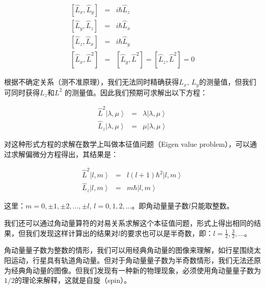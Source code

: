 \begin{eqnarray}
\left[ {\hat L_x ,\hat L_y } \right] &=& i\hbar \hat L_z \\
\left[ {\hat L_y ,\hat L_z } \right] &=& i\hbar \hat L_x \\
\left[ {\hat L_z, \hat L_x } \right] &=& i\hbar \hat L_y \\
\left[ {\hat L_x ,\hat L^2 } \right] &=& \left[ {\hat L_y ,\hat L^2 }
\right] = \left[ {\hat L_z ,\hat L^2 } \right] = 0
\end{eqnarray}

根据不确定关系（测不准原理），我们无法同时精确获得$L_x$, $L_y$的测量值，但我们可同时获得$L_z$和$L^2$
的测量值。因此我们预期可求解出以下方程：

\begin{eqnarray}
\hat L^2 \left| {\lambda ,\mu } \right\rangle &=& \lambda \left| {\lambda ,\mu } \right\rangle \\
\hat L_z \left| {\lambda ,\mu } \right\rangle &=& \mu \left| {\lambda ,\mu } \right\rangle
\end{eqnarray}

对这种形式方程的求解在数学上叫做本征值问题（Eigen value problem），可以通过求解偏微分方程得出，其结果是：

\begin{eqnarray}
\hat L^2 \left| {l,m} \right\rangle &=& l\left( {l + 1} \right)\hbar ^2 \left| {l,m} \right\rangle \\
\hat L_z \left| {l,m} \right\rangle &=& m\hbar \left| {l,m} \right\rangle
\end{eqnarray}

这里：$m = 0, \pm 1, \pm 2,..., \pm l$, $l = 0,1,2,...$。即角动量量子数$l$只能取整数。

我们还可以通过角动量算符的对易关系求解这个本征值问题，形式上得出相同的结果，但我们发现这样计算出的结果对$l$的要求也可以是半奇数，即：$l = \tfrac{1} {2},\tfrac{3} {2},...$。

角动量量子数为整数的情形，我们可以用经典角动量的图像来理解，如行星围绕太阳运动，行星具有轨道角动量。但对于角动量量子数为半奇数情形，我们无法还原为经典角动量的图像。但我们发现有一种新的物理现象，必须使用角动量量子数为$1/2$的理论来解释，这就是自旋（spin）。